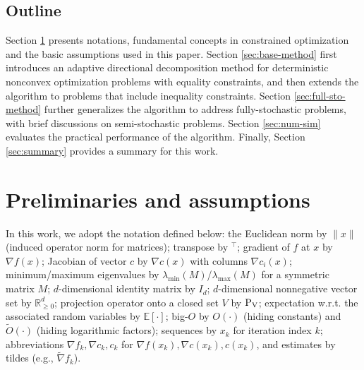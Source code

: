 \documentclass[11pt]{article}
\newcommand{\R}{\mathbb{R}}
\begin{document}
\subsection{Outline}
Section \ref{sec:basic} presents notations, fundamental concepts in constrained optimization and the basic assumptions used in this paper. Section \ref{sec:base-method} first introduces an adaptive directional decomposition  method for deterministic nonconvex optimization problems with equality constraints, and then extends the algorithm to problems that include inequality constraints. Section \ref{sec:full-sto-method} further generalizes the algorithm to address fully-stochastic problems, {with brief discussions on semi-stochastic problems}. Section \ref{sec:num-sim} evaluates the practical performance of the algorithm. Finally, Section \ref{sec:summary} provides a summary for this work. 

\section{Preliminaries and assumptions}\label{sec:basic}

In this work, we adopt the notation defined below:
the Euclidean norm by $\|x\|$ (induced operator norm for matrices); 
transpose by $^\top$; gradient of $f$ at $x$ by $\nabla f(x)$; Jacobian of vector $c$ by $\nabla c(x)$ with columns $\nabla c_i(x)$;  minimum/maximum eigenvalues by $\lambda_{\min}(M)$/$\lambda_{\max}(M)$ for a symmetric matrix \(M\); %
$d$-dimensional identity matrix by $I_d$; $d$-dimensional nonnegative vector set by $\R^d_{\ge 0}$; {projection operator onto a closed set $V$ by $\rm {\rm P}_V$;} expectation w.r.t. the associated random variables by $\mathbb{E}[\cdot]$; %
big-$O$ by $O(\cdot)$ (hiding constants) and $\tilde{O}(\cdot)$ (hiding  logarithmic factors); sequences by ${x_k}$ for iteration index ${k}$; abbreviations $\nabla f_k, \nabla c_k, c_k$ for $\nabla f(x_k), \nabla c(x_k), c(x_k)$, and estimates by tildes (e.g., $\tilde{\nabla} f_k$).  %
\end{document}
